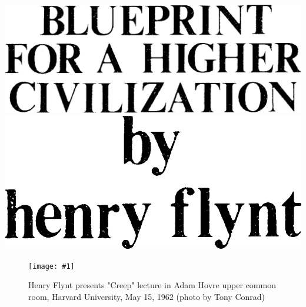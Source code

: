 \documentclass[10pt,twoside]{memoir}
\begin{document}
\frontmatter
\graphicspath{{img/}}
\pagestyle{ruled}
\openany

\renewcommand*{\thesection}{\Alph{section}}

\renewcommand*{\cftpartfont}{\bfseries\scshape}
\renewcommand*{\cftchapterfont}{\normalfont}
\renewcommand*{\cftsectionfont}{\itshape}
\renewcommand*{\chapterheadstart}{\vskip 1pt}



\newcommand{\emt}[1]{\textit{#1}}

\thispagestyle{empty}
{
	\centering
	\vfill
	\vfill
	\includegraphics[scale=1]{img/blueprint_title}
	\vfill
	\includegraphics[scale=1]{img/blueprint_author}
	\vfill

}

\clearpage

\newcommand{\photopage}[3]{
	\begin{figure}[!hp]
		\centering
		\texttt{[image: \#1]}
		\caption{#2 (photo by #3)}
	\end{figure}}

\photopage{img/creep}{Henry Flynt presents "Creep" lecture in Adam Hovre upper common room, Harvard University, May 15, 1962}{Tony Conrad}



\clearpage
\end{document}
